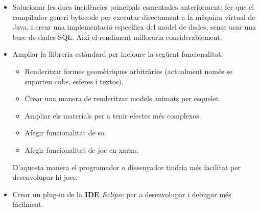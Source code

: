 \begin{itemize}
  \item Solucionar les dues incidències principals esmentades anteriorment: fer que el compilador generi bytecode per executar directament a la màquina virtual de Java, i crear una implementació específica del model de dades, sense usar una base de dades SQL. Així el rendiment milloraria considerablement.
  \item Ampliar la llibreria estàndard per incloure la següent funcionalitat:
  \begin{itemize}
    \item Renderitzar formes geomètriques arbitràries (actualment només se suporten cubs, esferes i textos).
    \item Crear una manera de renderitzar models animats per esquelet.
    \item Ampliar els materials per a tenir efectes més complexos.
    \item Afegir funcionalitat de so.
    \item Afegir funcionalitat de joc en xarxa.
  \end{itemize}
  D'aquesta manera el programador o dissenyador tindria més facilitat per desenvolupar-hi jocs.
  \item Crear un plug-in de la {\bf IDE} {\em Eclipse} per a desenvolupar i debugar més fàcilment.
\end{itemize}